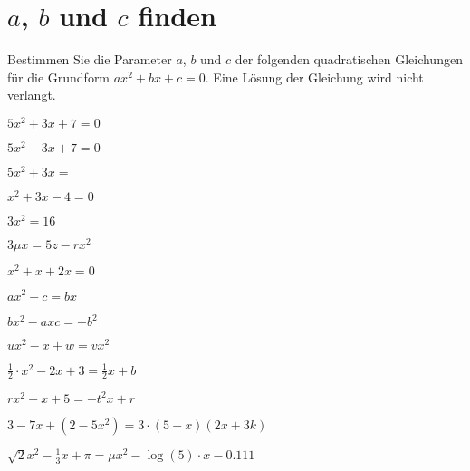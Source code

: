 \section{$a$, $b$ und $c$ finden}
Bestimmen Sie die Parameter $a$, $b$ und $c$ der folgenden quadratischen Gleichungen für die Grundform $ax^2 +bx +c = 0$. Eine Lösung der Gleichung wird nicht verlangt.
\begin{bbwAufgabenBlock}
\item $5x^2+3x+7 = 0$

\item $5x^2-3x+7 = 0$

\item $5x^2 + 3x = $

\item $ x^2+3x-4= 0$

\item $3x^2 =16 $

\item $3\mu x = 5z - rx^2 $

\item $ x^2+x+2x= 0$

\item $ax^2 + c = bx $

\item $bx^2 -axc = -b^2$

\item $ux^2 -x+w = vx^2 $

\item $\frac12\cdot{}x^2 -2x+3 = \frac12 x + b$

\item $rx^2-x+5 = -t^2x +r$

\item $ 3-7x+(2-5x^2) = 3\cdot{}(5-x)(2x+3k) $

\item $ \sqrt2x^2 - \frac13x + \pi = \mu x^2 - \log(5)\cdot{}x - 0.111 $

\end{bbwAufgabenBlock}
\newpage
